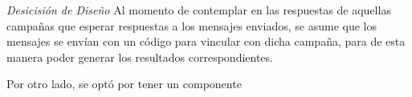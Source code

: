 \documentclass[a4paper, 11pt]{article}
\begin{document}

\emph{Desicisión de Diseño}
Al momento de contemplar en las respuestas de aquellas campañas que esperar respuestas a los mensajes enviados, se asume que los mensajes se envían con un código para vincular con dicha campaña, para de esta manera poder generar los resultados correspondientes.

Por otro lado, se optó por tener un componente %

\end{document}
